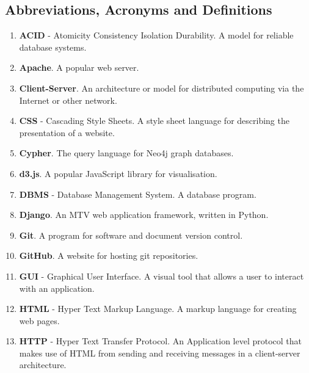 \documentclass[12pt,onecolumn]{article}
\begin{document}
	\subsection{Abbreviations, Acronyms and Definitions} %
	
	\begin{enumerate}
		\item \textbf{ACID} - Atomicity Consistency Isolation Durability. A model for reliable database systems.
		
		\item \textbf{Apache}. A popular web server.
		
		\item \textbf{Client-Server}. An architecture or model for distributed computing via the Internet or other network.
		
		\item \textbf{CSS} - Cascading Style Sheets. A style sheet language for describing the presentation of a website.
		
		\item \textbf{Cypher}. The query language for Neo4j graph databases.
		
		\item \textbf{d3.js}. A popular JavaScript library for visualisation.
		
		\item \textbf{DBMS} - Database Management System. A database program.
		
		\item \textbf{Django}. An MTV web application framework, written in Python.
		
		\item \textbf{Git}. A program for software and document version control.
		
		\item \textbf{GitHub}. A website for hosting git repositories.
		
		\item \textbf{GUI} - Graphical User Interface. A visual tool that allows a user to interact with an application.
		
		\item \textbf{HTML} - Hyper Text Markup Language. A markup language for creating web pages.
		
		\item \textbf{HTTP} - Hyper Text Transfer Protocol. An Application level protocol that makes use of HTML from sending and receiving messages in a client-server architecture.
		

\end{enumerate}
\end{document}
